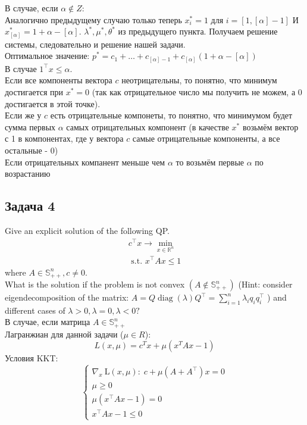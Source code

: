 \documentclass[a4paper,12pt]{article} %
\begin{document}
В случае, если $ \alpha \notin Z $:\\
Аналогично предыдущему случаю только теперь $x^*_i = 1 $ для $ i = [1, [\alpha] - 1] $ И $ x^*_{[\alpha]} = 1 + \alpha - \left[ \alpha \right] $. $\lambda^*, \mu^*, \theta^* $ из предыдущего пункта. Получаем решение системы, следовательно и решение нашей задачи. \\
Оптимальное значение: $ p^* = c_1 + \ldots + c_{\left[\alpha \right] - 1} + c_{\left[\alpha \right]} \left( 1 + \alpha - \left[ \alpha \right]  \right) $\\

В случае $1^{\top} x \leq \alpha$.\\
Если все компоненты вектора $ c $ неотрицательны, то понятно, что минимум достигается при $ x^* = 0 $ (так как отрицательное число мы получить не можем, а 0 достигается в этой точке).\\
Если же у $ c $ есть отрицательные компонеты, то понятно, что минимумом будет сумма первых $ \alpha $ самых отрицательных компонент (в качестве $ x^* $ возьмём вектор с 1 в компонентах, где у вектора $ c $ самые отрицательные компоненты, а все остальные - 0) \\
Если отрицательных компанент меньше чем $ \alpha $ то возьмём первые $ \alpha $ по возрастанию



\subsection*{Задача 4}
Give an explicit solution of the following QP.
$$
\begin{array}{r}
c^{\top} x \rightarrow \min\limits _{x \in \mathbb{R}^{n}} \\
\text { s.t. } x^{\top} A x \leq 1
\end{array}
$$
where $A \in \mathbb{S}_{++}^{n}, c \neq 0 .$\\ What is the solution if the problem is not convex $\left(A \notin \mathbb{S}_{++}^{n}\right)$ (Hint:
consider eigendecomposition of the matrix: $A=Q \operatorname{diag}(\lambda) Q^{\top}=\sum_{i=1}^{n} \lambda_{i} q_{i} q_{i}^{\top}$ ) and different cases of $\lambda>0, \lambda=0, \lambda<0 ?$\\

В случае, если матрица $A \in \mathbb{S}_{++}^{n} $\\
Лагранжиан для данной задачи ($ \mu \in R $): 
$$L(x, \mu)=c^{T} x+\mu\left(x^{T} A x-1\right)$$
Условия KKT:
$$
\left\{\begin{array}{l}
\nabla_{x} \mathrm{~L}(x, \mu): \; c+\mu\left(A+A^{\top}\right) x=0 \\
\mu \geqslant 0 \\
\mu\left(x^{\top} A x-1\right)=0 \\
x^{\top} A x-1 \leqslant 0
\end{array}\right.
$$
\end{document}
